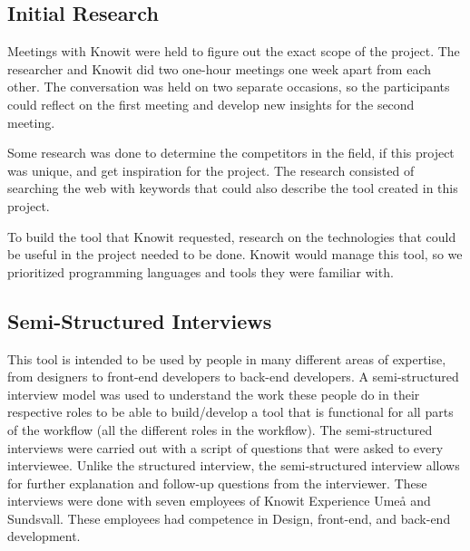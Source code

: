 \newpage
\subsection{Initial Research}%
\label{sub:Initial Research}

Meetings with Knowit were held to figure out the exact scope of the project. The researcher and Knowit did two one-hour meetings one week apart from each other. The conversation was held on two separate occasions, so the participants could reflect on the first meeting and develop new insights for the second meeting. 

Some research was done to determine the competitors in the field, if this project was unique, and get inspiration for the project. The research consisted of searching the web with keywords that could also describe the tool created in this project.  

To build the tool that Knowit requested, research on the technologies that could be useful in the project needed to be done. Knowit would manage this tool, so we prioritized programming languages and tools they were familiar with.



\subsection{Semi-Structured Interviews}%
\label{sub:inteviews}
This tool is intended to be used by people in many different areas of expertise, from designers to front-end developers to back-end developers. A semi-structured interview model was used \cite{galletta2013mastering} to understand the work these people do in their respective roles to be able to build/develop a tool that is functional for all parts of the workflow (all the different roles in the workflow). The semi-structured interviews were carried out with a script of questions that were asked to every interviewee. Unlike the structured interview, the semi-structured interview allows for further explanation and follow-up questions from the interviewer. These interviews were done with seven employees of Knowit Experience Umeå and Sundsvall. These employees had competence in Design, front-end, and back-end development.

